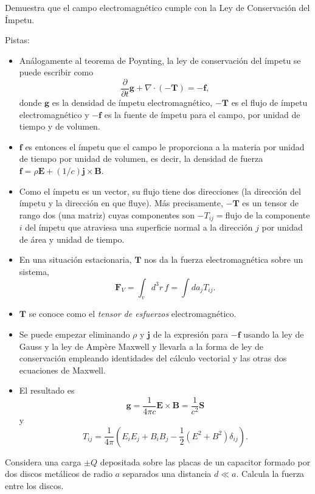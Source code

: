 \documentclass{exam}
\begin{document}
\begin{questions}
\question\label{18} Demuestra que el campo electromagnético cumple con
  la Ley de Conservación del Ímpetu.

  Pistas:
  \begin{itemize}
  \item Análogamente al teorema de Poynting, la ley de conservación
    del ímpetu se puede escribir como
    $$
    \frac{\partial}{\partial t} \bm g +\nabla\cdot(-\bm T)=-\bm f,
    $$
    donde $\bm g$ es la densidad de ímpetu electromagnético, $-\bm T$
    es el flujo de ímpetu electromagnético y $-\bm f$ es la fuente de
    ímpetu para el campo, por unidad de tiempo y de volumen.
  \item $\bm f$ es entonces el ímpetu que el campo le proporciona a la
    materia por unidad de tiempo por unidad de volumen, es decir, la
    densidad de fuerza $\bm f=\rho\bm E+(1/c)\bm j\times\bm B$.
  \item Como el ímpetu es un vector, su flujo tiene dos direcciones
    (la dirección del ímpetu y la dirección en que fluye). Más
    precisamente, $-\bm T$ es un tensor de rango dos (una matriz)
    cuyas componentes son $-T_{ij}=$flujo de la componente $i$ del
    ímpetu que atraviesa una superficie normal a la dirección $j$ por
    unidad de área y unidad de tiempo.
  \item En una situación estacionaria, $\bm T$ nos da la fuerza
    electromagnética sobre un sistema,
    $$
    \bm F_V=\int_v d^3r\, f=\int da_j T_{ij}.
    $$
  \item $\bm T$ se conoce como el {\em tensor de esfuerzos}
    electromagnético.
  \item Se puede empezar eliminando $\rho$ y $\bm j$ de la expresión
    para $-\bm f$ usando la ley de Gauss y la ley de Ampère Maxwell y
    llevarla a la forma de ley de conservación empleando identidades
    del cálculo vectorial y las otras dos ecuaciones de Maxwell.
  \item El resultado es
    $$
    \bm g=\frac{1}{4\pi c}\bm E\times\bm B=\frac{1}{c^2}\bm S
    $$
    y
    $$
    T_{ij}=\frac{1}{4\pi}\left(E_iE_j+B_iB_j-\frac{1}{2}(E^2+B^2)\delta_{ij}\right).
    $$
  \end{itemize}

\question\label{19} Considera una carga $\pm Q$ depositada sobre las
  placas de un capacitor formado por dos discos metálicos de radio $a$
  separados una distancia $d\ll a$. Calcula la fuerza entre los
  discos.


\end{questions}
\end{document}
